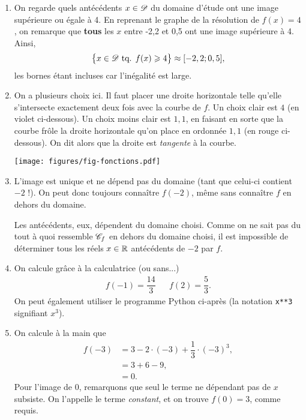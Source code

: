 {\begin{enumerate}
		\item
		On regarde quels antécédents $x \in \mathcal{D}$ du domaine d'étude ont une image supérieure ou égale à 4.
		En reprenant le graphe de la résolution de $f(x) = 4$, on remarque que \textbf{tous} les $x$ entre -2,2 et 0,5 ont une image supérieure à 4.
		Ainsi, 
			\[ \bigl\{  x \in \mathcal{D} \text{ tq. } f(x) \geqslant 4  \bigr\} \approx [-2,2 ; 0,5], \]
		les bornes étant incluses car l'inégalité est large.
		
		\item 
		On a plusieurs choix ici. 
		Il faut placer une droite horizontale telle qu'elle s'intersecte exactement deux fois avec la courbe de $f$.
		Un choix clair est $4$ (en violet ci-dessous).
		Un choix moins clair est $1,1$, en faisant en sorte que la courbe frôle la droite horizontale qu'on place en ordonnée $1,1$ (en rouge ci-dessous).
		On dit alors que la droite est \emph{tangente} à la courbe.
		
			\begin{center}
			\texttt{[image: figures/fig-fonctions.pdf]}
			\end{center}
		
		\item L'image est unique et ne dépend pas du domaine (tant que celui-ci contient $-2$ !).
		On peut donc toujours connaître $f(-2)$, même sans connaître $f$ en dehors du domaine.
		
		Les antécédents, eux, dépendent du domaine choisi.
		Comme on ne sait pas du tout à quoi ressemble $\mathcal{C}_f$ en dehors du domaine choisi, il est impossible de déterminer tous les réels $x\in\mathbb{R}$ antécédents de $-2$ par $f$.
		
		\item On calcule grâce à la calculatrice (ou sans...)
			\begin{align*}
				f(-1) = \dfrac{14}3 && f(2) =  \dfrac53.
			\end{align*}
		On peut également utiliser le programme Python ci-après (la notation \texttt{x**3} signifiant $x^3$).
	
		\begin{center}
		\end{center}
		
		\item On calcule à la main que
			\begin{align*}
				f(-3) &= 3 - 2 \cdot (-3) + \dfrac13 \cdot (-3)^3, \\
					&= 3 + 6 - 9, \\
					&= 0.
			\end{align*}
		Pour l'image de $0$, remarquons que seul le terme ne dépendant pas de $x$ subsiste. 
		On l'appelle le terme \emph{constant}, et on trouve $f(0) = 3$, comme requis.
	\end{enumerate}
}


